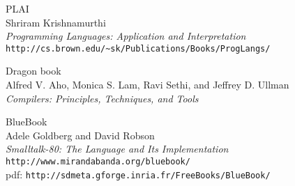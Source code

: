 \begin{thebibliography}{99}

 PLAI\\
Shriram Krishnamurthi\\
\emph{Programming Languages: Application and Interpretation}\\
\verb|http://cs.brown.edu/~sk/Publications/Books/ProgLangs/|

 Dragon book\\
Alfred V. Aho, Monica S. Lam, Ravi Sethi, and Jeffrey D. Ullman\\
\emph{Compilers: Principles, Techniques, and Tools}

 BlueBook\\
Adele Goldberg and David Robson\\
\emph{Smalltalk-80: The Language and Its Implementation}\\
\verb|http://www.mirandabanda.org/bluebook/|\\
pdf: \verb|http://sdmeta.gforge.inria.fr/FreeBooks/BlueBook/|

\end{thebibliography}